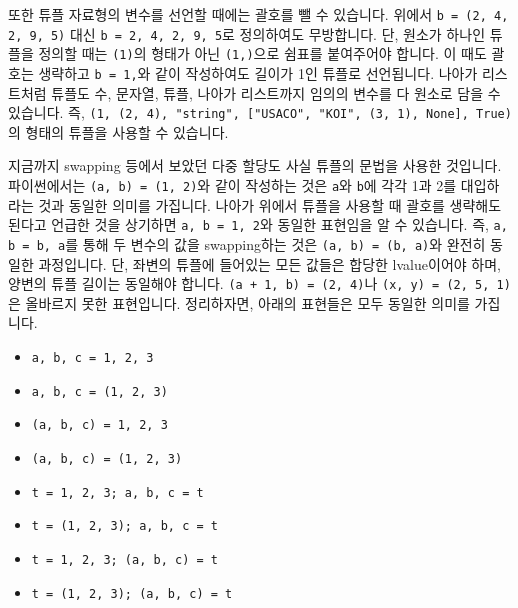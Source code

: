 \documentclass[../main.tex]{subfiles}
\begin{document}
또한 튜플 자료형의 변수를 선언할 때에는 괄호를 뺄 수 있습니다.
위에서 \texttt{b = (2, 4, 2, 9, 5)} 대신 \texttt{b = 2, 4, 2, 9, 5}로 정의하여도 무방합니다.
단, 원소가 하나인 튜플을 정의할 때는 \texttt{(1)}의 형태가 아닌 \texttt{(1,)}으로 쉼표를 붙여주어야 합니다.
이 때도 괄호는 생략하고 \texttt{b = 1,}와 같이 작성하여도 길이가 1인 튜플로 선언됩니다.
나아가 리스트처럼 튜플도 수, 문자열, 튜플, 나아가 리스트까지 임의의 변수를 다 원소로 담을 수 있습니다.
즉, \texttt{(1, (2, 4), "string", ["USACO", "KOI", (3, 1), None], True)}의 형태의 튜플을 사용할 수 있습니다.

지금까지 swapping 등에서 보았던 다중 할당도 사실 튜플의 문법을 사용한 것입니다.
파이썬에서는 \texttt{(a, b) = (1, 2)}와 같이 작성하는 것은 \texttt{a}와 \texttt{b}에 각각 1과 2를 대입하라는 것과 동일한 의미를 가집니다.
나아가 위에서 튜플을 사용할 때 괄호를 생략해도 된다고 언급한 것을 상기하면 \texttt{a, b = 1, 2}와 동일한 표현임을 알 수 있습니다.
즉, \texttt{a, b = b, a}를 통해 두 변수의 값을 swapping하는 것은 \texttt{(a, b) = (b, a)}와 완전히 동일한 과정입니다.
단, 좌변의 튜플에 들어있는 모든 값들은 합당한 lvalue이어야 하며, 양변의 튜플 길이는 동일해야 합니다.
\texttt{(a + 1, b) = (2, 4)}나 \texttt{(x, y) = (2, 5, 1)}은 올바르지 못한 표현입니다.
정리하자면, 아래의 표현들은 모두 동일한 의미를 가집니다.
\begin{itemize}
    \item \texttt{a, b, c = 1, 2, 3}
    \item \texttt{a, b, c = (1, 2, 3)}
    \item \texttt{(a, b, c) = 1, 2, 3}
    \item \texttt{(a, b, c) = (1, 2, 3)}
    \item \texttt{t = 1, 2, 3; a, b, c = t}
    \item \texttt{t = (1, 2, 3); a, b, c = t}
    \item \texttt{t = 1, 2, 3; (a, b, c) = t}
    \item \texttt{t = (1, 2, 3); (a, b, c) = t}
\end{itemize}
\end{document}
